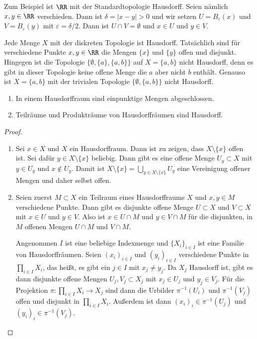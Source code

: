 Zum Beispiel ist $\RR$ mit der Standardtopologie Hausdorff. Seien nämlich $x,y\in\RR$ verschieden. Dann ist $\delta = |x-y| > 0$ und wir setzen $U = B_\varepsilon(x)$ und $V= B_\varepsilon(y)$ mit $\varepsilon = \delta/2$. Dann ist $U\cap V = \emptyset$ und $x\in U$ und $y\in V$.

Jede Menge $X$ mit der diskreten Topologie ist Hausdorff. Tatsächlich sind für verschiedene Punkte $x,y\in\RR$ die Mengen $\{x\}$ und $\{y\}$ offen und disjunkt. Hingegen ist die Topologie $\{\emptyset, \{a\}, \{a,b\}\}$ auf $X = \{a,b\}$ nicht Hausdorff, denn es gibt in dieser Topologie keine offene Menge die $a$ aber nicht $b$ enthält. Genauso ist $X = \{a,b\}$ mit der trivialen Topologie $\{\emptyset,\{a,b\}\}$ nicht Hausdorff.

\begin{lemma}\leavevmode
\begin{enumerate}
\item In einem Hausdorffraum sind einpunktige Mengen abgeschlossen.
\item Teilräume und Produkträume von Hausdorffräumen sind Hausdorff.
\end{enumerate}
\end{lemma}
\begin{proof}\leavevmode
\begin{enumerate}
\item Sei $x\in X$ und $X$ ein Hausdorffraum. Dann ist zu zeigen, dass $X\setminus\{x\}$ offen ist. Sei dafür $y\in X\setminus\{x\}$ beliebig. Dann gibt es eine offene Menge $U_y\subset X$ mit $y\in U_y$ und $x\not\in U_y$. Damit ist $X\setminus\{x\} = \bigcup_{y\in X\setminus\{x\}} U_y$ eine Vereinigung offener Mengen und daher selbst offen.
\item Seien zuerst $M\subset X$ ein Teilraum eines Hausdorffraums $X$ und $x,y\in M$ verschiedene Punkte. Dann gibt es disjunkte offene Menge $U\subset X$ und $V\subset X$ mit $x\in U$ und $y\in V$. Also ist $x\in U\cap M$ und $y\in V\cap M$ für die disjunkten, in $M$ offenen Mengen $U\cap M$ und $V\cap M$.

Angenommen $I$ ist eine beliebige Indexmenge und $\{X_i\}_{i\in I}$ ist eine Familie von Hausdorffräumen. Seien $(x_i)_{i\in I}$ und $(y_i)_{i\in I}$ verschiedene Punkte in $\prod_{i\in I}X_i$, das heißt, es gibt ein $j\in I$ mit $x_j\neq y_j$. Da $X_j$ Hausdorff ist, gibt es dann disjunkte offene Mengen $U_j,V_j\subset X_j$ mit $x_j\in U_j$ und $y_j\in V_j$. Für die Projektion $\pi\colon\prod_{i\in I} X_i\to X_j$ sind dann die Urbilder $\pi^{-1}(U_i)$ und $\pi^{-1}(V_j)$ offen und disjunkt in $\prod_{i\in I} X_i$. Außerdem ist dann $(x_i)_i\in\pi^{-1}(U_j)$ und $(y_i)_i\in\pi^{-1}(V_j)$.\qedhere
\end{enumerate}
\end{proof}

